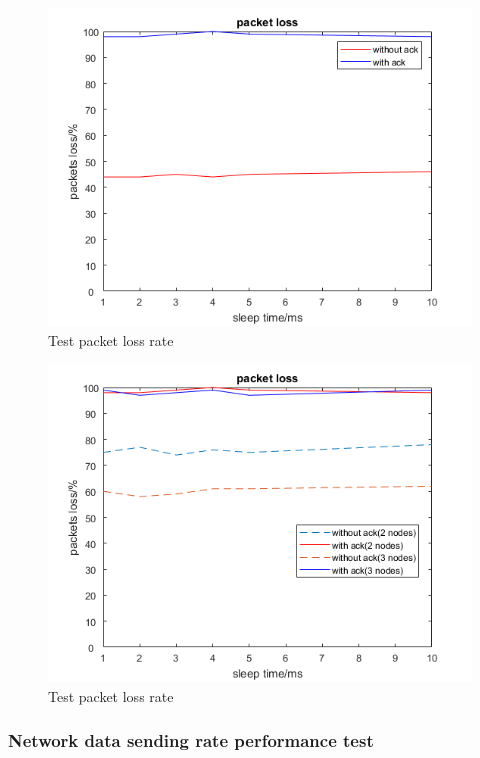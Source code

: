 \begin{figure}
    \centering
    \includegraphics{Figures/packetloss.png}
    \caption{Test packet loss rate}
    \label{fig:packetloss}
\end{figure}

\begin{figure}
    \centering
    \includegraphics{Figures/packetlossNEW.png}
    \caption{Test packet loss rate}
    \label{fig:packetlossnew}
\end{figure}

\subsubsection{Network data sending rate performance test}

